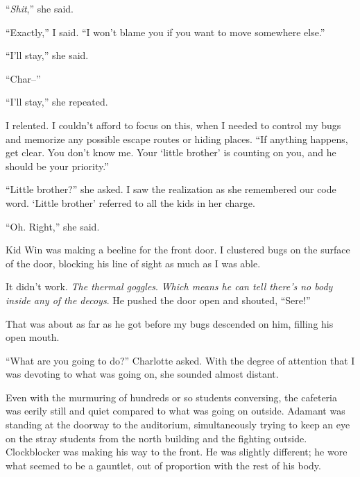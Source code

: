 ``\emph{Shit},'' she said.



``Exactly,'' I said.  ``I won't blame you if you want to move somewhere else.''



``I'll stay,'' she said.



``Char--''



``I'll stay,'' she repeated.



I relented.  I couldn't afford to focus on this, when I needed to control my bugs and memorize any possible escape routes or hiding places.  ``If anything happens, get clear.  You don't know me.  Your `little brother' is counting on you, and he should be your priority.''



``Little brother?'' she asked.  I saw the realization as she remembered our code word.  `Little brother' referred to all the kids in her charge.



``Oh.  Right,'' she said.



Kid Win was making a beeline for the front door.  I clustered bugs on the surface of the door, blocking his line of sight as much as I was able.



It didn't work.  \emph{The thermal goggles}.  \emph{Which means he can tell there's no body inside any of the decoys}.  He pushed the door open and shouted, ``Sere!''



That was about as far as he got before my bugs descended on him, filling his open mouth.



``What are you going to do?'' Charlotte asked.  With the degree of attention that I was devoting to what was going on, she sounded almost distant.



Even with the murmuring of hundreds or so students conversing, the cafeteria was eerily still and quiet compared to what was going on outside.  Adamant was standing at the doorway to the auditorium, simultaneously trying to keep an eye on the stray students from the north building and the fighting outside.  Clockblocker was making his way to the front.  He was slightly different; he wore what seemed to be a gauntlet, out of proportion with the rest of his body.



